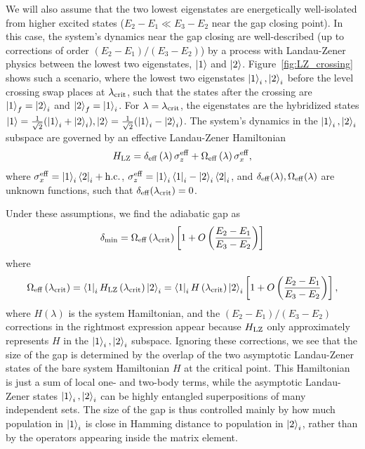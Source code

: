 \documentclass[twocolumn,amssymb,secnumarabic, prl, aps, nofootinbib]{revtex4-1}
\begin{document}
We will also assume that the two lowest eigenstates are energetically well-isolated from higher excited states ($E_2-E_1\ll E_3-E_2$ near the gap closing point). In this case, the system's dynamics near the gap closing are well-described (up to corrections of order $(E_2-E_1)/(E_3-E_2)$) by a process with
Landau-Zener physics between the lowest two eigenstates, $\ket{1}$ and $\ket{2}$.
Figure~\ref{fig:LZ_crossing} shows such a scenario, where the lowest two eigenstates $\ket{1}_i, \ket{2}_i$ before the level crossing swap places at  $\lambda_{\rm{crit}}$, such that the states after the crossing are $\ket{1}_f = \ket{2}_i$ and $\ket{2}_f = \ket{1}_i$. For $\lambda=\lambda_{\rm{crit}}$, the eigenstates are the hybridized states $\ket{1}=\frac{1}{\sqrt{2}}(\ket{1}_i+\ket{2}_i), \ket{2}=\frac{1}{\sqrt{2}}(\ket{1}_i-\ket{2}_i)$. The system's dynamics in the $\ket{1}_i,\ket{2}_i$ subspace are governed by an effective Landau-Zener Hamiltonian
\begin{equation}
	H_{\rm{LZ}}=\delta_{\rm{eff}}\left(\lambda\right)\sigma_z^{\rm{eff}}+\Omega_{\rm{eff}}\left(\lambda\right)\sigma_x^{\rm{eff}},
\end{equation}
where $\sigma_x^{\rm{eff}}=\ket{1}_i\bra{2}_i+\mathrm{h.c.}$,  $\sigma_z^{\rm{eff}}=\ket{1}_i\bra{1}_i-\ket{2}_i\bra{2}_i$, and $\delta_{\rm{eff}}(\lambda),\Omega_{\rm{eff}}(\lambda)$ are unknown functions, such that $\delta_{\rm{eff}}(\lambda_{\text{crit}})=0$.

Under these assumptions, we find the adiabatic gap as 
\begin{equation}
	\delta_{\rm{\min}}=\Omega_{\rm{eff}}\left(\lambda_{\rm{crit}}\right)\left[1+O\left(\frac{E_2-E_1}{E_3-E_2}\right)\right]
\end{equation} 
where
\begin{equation}
	\Omega_{\rm{eff}}\left(\lambda_{\rm{crit}}\right)=\bra{1}_i H_{\rm{LZ}}\left(\lambda_{\rm{crit}}\right)\ket{2}_i=\bra{1}_i H\left(\lambda_{\rm{crit}}\right)\ket{2}_i\left[1+O\left(\frac{E_2-E_1}{E_3-E_2}\right)\right],
\end{equation}
where $H(\lambda)$ is the system Hamiltonian, and the $(E_2-E_1)/(E_3-E_2)$ corrections in the rightmost expression appear because $H_{\rm{LZ}}$ only approximately represents $H$ in the $\ket{1}_i,\ket{2}_i$ subspace.
Ignoring these corrections, 
we see that the size of the gap is determined by the overlap of the two asymptotic Landau-Zener states of the bare system Hamiltonian $H$ at the critical point.
This Hamiltonian is just a sum of local one- and two-body terms, while the asymptotic Landau-Zener states $\ket{1}_i,\ket{2}_i$ can be highly entangled superpositions of many independent sets. The size of the gap is thus controlled mainly by how much population in $\ket{1}_i$ is close in Hamming distance to population in $\ket{2}_i$, rather than by the operators appearing inside the matrix element.
\end{document}
